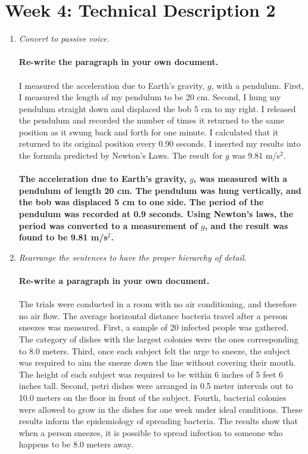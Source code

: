 \documentclass{article}
\begin{document}
\section{Week 4: Technical Description 2}

\begin{enumerate}
\item \textit{Convert to passive voice.} \\ \\
\textbf{Re-write the paragraph in your own document.} \\ \\
I measured the acceleration due to Earth's gravity, $g$, with a pendulum.  First, I measured the length of my pendulum to be 20 cm.  Second, I hung my pendulum straight down and displaced the bob 5 cm to my right.  I released the pendulum and recorded the number of times it returned to the same position as it swung back and forth for one minute.  I calculated that it returned to its original position every 0.90 seconds.  I inserted my results into the formula predicted by Newton's Laws.  The result for $g$ was 9.81 m/s$^2$. \\ \\
\textbf{The acceleration due to Earth's gravity, $g$, was measured with a pendulum of length 20 cm.  The pendulum was hung vertically, and the bob was displaced 5 cm to one side.  The period of the pendulum was recorded at 0.9 seconds.  Using Newton's laws, the period was converted to a measurement of $g$, and the result was found to be 9.81 m/s$^2$.}
\item \textit{Rearrange the sentences to have the proper hierarchy of detail.} \\ \\
\textbf{Re-write a paragraph in your own document.} \\ \\
The trials were conducted in a room with no air conditioning, and therefore no air flow.  The average horizontal distance bacteria travel after a person sneezes was measured.  First, a sample of 20 infected people was gathered.  The category of dishes with the largest colonies were the ones corresponding to 8.0 meters.  Third, once each subject felt the urge to sneeze, the subject was required to aim the sneeze down the line without covering their mouth.  The height of each subject was required to be within 6 inches of 5 feet 6 inches tall.  Second, petri dishes were arranged in 0.5 meter intervals out to 10.0 meters on the floor in front of the subject.  Fourth, bacterial colonies were allowed to grow in the dishes for one week under ideal conditions.  These results inform the epidemiology of spreading bacteria. The results show that when a person sneezes, it is possible to spread infection to someone who happens to be 8.0 meters away. \\ \\

\end{enumerate}
\end{document}
